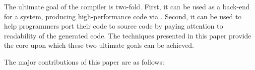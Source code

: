 The ultimate goal of the \mixten compiler is two-fold.  First, it can be used
as a back-end for a \matlab system,  producing high-performance code via \xten.
Second, it can be used to help programmers port their \matlab code to \xten
source code by paying attention to readability of the generated code.
The techniques presented in this paper provide the core upon
which these two ultimate goals can be achieved.



\begin{comment}
\mixten is built on top of the \mclab front-end and analysis toolkits.  
- Introduce \matlab briefly, why is it difficult but important to have a
  static compiler for it and why do we choose \xten as our target.- concentrate
more on high -level issues like lack of documentation, scientists are not
programmers,performance issues, popularity, need for static compilation to
other high-level languages. We talk about \matlab semantics and wild features
in the next section\smallskip
- Briefly introduce the high-level design of \mixten.\smallskip 
\end{comment}
  
The major contributions  of this paper are as follows:

